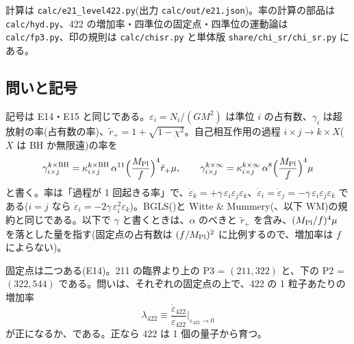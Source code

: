 計算は \texttt{calc/e21\_level422.py}(出力 \texttt{calc/out/e21.json})。率の計算の部品は \texttt{calc/hyd.py}、422 の増加率・四準位の固定点・四準位の運動論は \texttt{calc/fp3.py}、印の規則は \texttt{calc/chisr.py} と単体版 \texttt{share/chi\_sr/chi\_sr.py} にある。

\subsection{問いと記号}

記号は E14・E15 と同じである。$\varepsilon_i=N_i/(GM^2)$ は準位 $i$ の占有数、$\gamma_i$ は超放射の率(占有数の率)、$\tilde r_+=1+\sqrt{1-\chi^2}$。自己相互作用の過程 $i\times j\to k\times X$($X$ は BH か無限遠)の率を
\begin{equation}
\gamma^{k\times\mathrm{BH}}_{i\times j}=\kappa^{k\times\mathrm{BH}}_{i\times j}\,\alpha^{11}\Bigl(\frac{M_\mathrm{Pl}}{f}\Bigr)^4\tilde r_+\mu,\qquad
\gamma^{k\times\infty}_{i\times j}=\kappa^{k\times\infty}_{i\times j}\,\alpha^{8}\Bigl(\frac{M_\mathrm{Pl}}{f}\Bigr)^4\mu
\label{eq:e21def}
\end{equation}
と書く。率は「過程が 1 回起きる率」で、$\dot\varepsilon_k=+\gamma\,\varepsilon_i\varepsilon_j\varepsilon_k$、$\dot\varepsilon_i=\dot\varepsilon_j=-\gamma\,\varepsilon_i\varepsilon_j\varepsilon_k$ である($i=j$ なら $\dot\varepsilon_i=-2\gamma\,\varepsilon_i^2\varepsilon_k$)。BGLS()と Witte \& Mummery(、以下 WM)の規約と同じである。以下で $\gamma$ と書くときは、$\alpha$ のべきと $\tilde r_+$ を含み、$(M_\mathrm{Pl}/f)^4\mu$ を落とした量を指す(固定点の占有数は $(f/M_\mathrm{Pl})^2$ に比例するので、増加率は $f$ によらない)。

固定点は二つある(E14)。211 の臨界より上の P3 = $(211,322)$ と、下の P2 = $(322,544)$ である。問いは、それぞれの固定点の上で、422 の 1 粒子あたりの増加率
\begin{equation}
\lambda_{422}\equiv\frac{\dot\varepsilon_{422}}{\varepsilon_{422}}\Big|_{\varepsilon_{422}\to0}
\end{equation}
が正になるか、である。正なら 422 は 1 個の量子から育つ。


